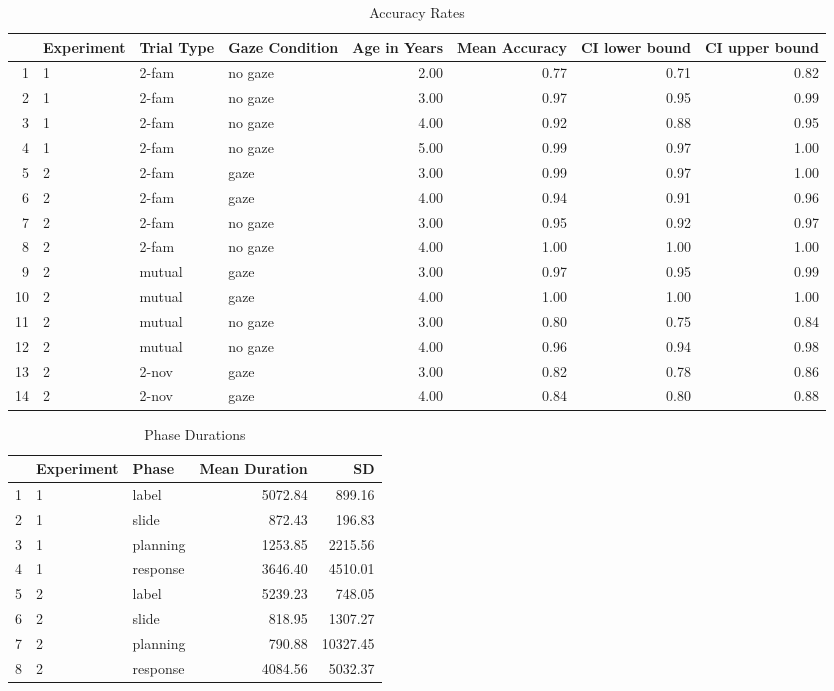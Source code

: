 \documentclass[a4paper,man,apacite,floatsintext]{apa6}
\begin{document}
\begin{table}[h]
\centering
\begin{tabular}{rlllrrrr}
  \hline
 & Experiment & Trial Type & Gaze Condition & Age in Years & Mean Accuracy & CI lower bound & CI upper bound \\ 
  \hline
1 & 1 & 2-fam & no gaze & 2.00 & 0.77 & 0.71 & 0.82 \\ 
  2 & 1 & 2-fam & no gaze & 3.00 & 0.97 & 0.95 & 0.99 \\ 
  3 & 1 & 2-fam & no gaze & 4.00 & 0.92 & 0.88 & 0.95 \\ 
  4 & 1 & 2-fam & no gaze & 5.00 & 0.99 & 0.97 & 1.00 \\ 
   \hline
5 & 2 & 2-fam & gaze & 3.00 & 0.99 & 0.97 & 1.00 \\ 
  6 & 2 & 2-fam & gaze & 4.00 & 0.94 & 0.91 & 0.96 \\ 
  7 & 2 & 2-fam & no gaze & 3.00 & 0.95 & 0.92 & 0.97 \\ 
  8 & 2 & 2-fam & no gaze & 4.00 & 1.00 & 1.00 & 1.00 \\ 
  9 & 2 & mutual & gaze & 3.00 & 0.97 & 0.95 & 0.99 \\ 
  10 & 2 & mutual & gaze & 4.00 & 1.00 & 1.00 & 1.00 \\ 
  11 & 2 & mutual & no gaze & 3.00 & 0.80 & 0.75 & 0.84 \\ 
  12 & 2 & mutual & no gaze & 4.00 & 0.96 & 0.94 & 0.98 \\ 
  13 & 2 & 2-nov & gaze & 3.00 & 0.82 & 0.78 & 0.86 \\ 
  14 & 2 & 2-nov & gaze & 4.00 & 0.84 & 0.80 & 0.88 \\ 
   \hline
\end{tabular}
\caption{Accuracy Rates} 
\label{tab:acc_table}
\end{table}

\begin{table}[h]
\centering
\begin{tabular}{rllrr}
  \hline
 & Experiment & Phase & Mean Duration & SD \\ 
  \hline
1 & 1 & label & 5072.84 & 899.16 \\ 
  2 & 1 & slide & 872.43 & 196.83 \\ 
  3 & 1 & planning & 1253.85 & 2215.56 \\ 
  4 & 1 & response & 3646.40 & 4510.01 \\ 
   \hline
5 & 2 & label & 5239.23 & 748.05 \\ 
  6 & 2 & slide & 818.95 & 1307.27 \\ 
  7 & 2 & planning & 790.88 & 10327.45 \\ 
  8 & 2 & response & 4084.56 & 5032.37 \\ 
   \hline
\end{tabular}
\caption{Phase Durations} 
\label{tab:phases}
\end{table}
\end{document}
